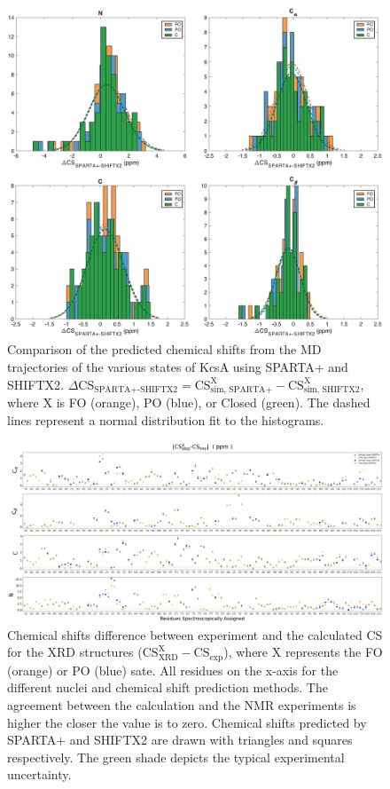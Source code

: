 \documentclass[%
 aip,
 amsmath,amssymb,
 preprint,%
]{revtex4-1}
\begin{document}
\begin{figure}[tbp]
	\includegraphics[width=\textwidth]{figures_SI/SHIFTX2_SPARTA-02.eps}
	 \caption{\scriptsize
	 Comparison of the predicted chemical shifts from the MD trajectories of the various states of KcsA using SPARTA+ and SHIFTX2. $\Delta\text{CS}_{\text{SPARTA+-SHIFTX2}} = \text{CS}^{\text{X}}_{\text{sim, SPARTA+}} - \text{CS}^{\text{X}}_{\text{sim, SHIFTX2}} $, where X is FO (orange), PO (blue), or Closed (green). The dashed lines represent a normal distribution fit to the histograms.
}
\label{SI_SPARTA_v_SHIFTX2}
\end{figure}

\begin{figure}
	\includegraphics[width=\textwidth]{figures_SI/assignment_skew_model_all_print_no_ref_XRD.png}
 	 \caption{\scriptsize
    Chemical shifts difference between experiment and the calculated CS for the XRD structures ($\text{CS}_{\text{XRD}}^{\text{X}}-\text{CS}_{\text{exp}}$), where X represents the FO (orange) or PO (blue) sate. All residues on the x-axis for the different nuclei and chemical shift prediction methods. The agreement between the calculation and the NMR experiments is higher the closer the value is to zero. Chemical shifts predicted by SPARTA+ and SHIFTX2 are drawn with triangles and squares respectively. The green shade depicts the typical experimental uncertainty.}
\label{SI_assignment_XRD}
\end{figure}
\end{document}
